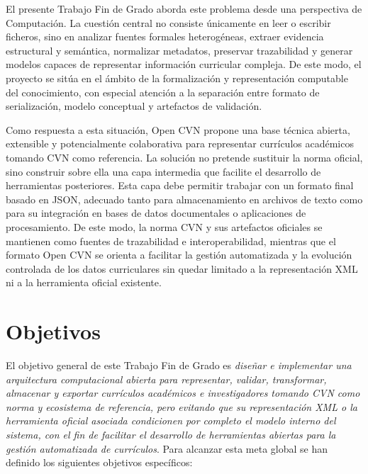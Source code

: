 El presente Trabajo Fin de Grado aborda este problema desde una perspectiva de
Computación. La cuestión central no consiste únicamente en leer o escribir
ficheros, sino en analizar fuentes formales heterogéneas, extraer evidencia
estructural y semántica, normalizar metadatos, preservar trazabilidad y generar
modelos capaces de representar información curricular compleja. De este modo, el
proyecto se sitúa en el ámbito de la formalización y representación computable del
conocimiento, con especial atención a la separación entre formato de
serialización, modelo conceptual y artefactos de validación.

Como respuesta a esta situación, Open CVN propone una base técnica abierta,
extensible y potencialmente colaborativa para representar currículos académicos
tomando CVN como referencia. La solución no pretende sustituir la norma oficial,
sino construir sobre ella una capa intermedia que facilite el desarrollo de
herramientas posteriores. Esta capa debe permitir trabajar con un formato final
basado en JSON, adecuado tanto para almacenamiento en archivos de texto como para
su integración en bases de datos documentales o aplicaciones de procesamiento. De
este modo, la norma CVN y sus artefactos oficiales se mantienen como fuentes de
trazabilidad e interoperabilidad, mientras que el formato Open CVN se orienta a
facilitar la gestión automatizada y la evolución controlada de los datos
curriculares sin quedar limitado a la representación XML ni a la herramienta
oficial existente.

\section{Objetivos}
\label{sec:introduccion_objetivos}

El objetivo general de este Trabajo Fin de Grado es \textit{diseñar e implementar
una arquitectura computacional abierta para representar, validar, transformar,
almacenar y exportar currículos académicos e investigadores tomando CVN como norma
y ecosistema de referencia, pero evitando que su representación XML o la
herramienta oficial asociada condicionen por completo el modelo interno del
sistema, con el fin de facilitar el desarrollo de herramientas abiertas para la
gestión automatizada de currículos}. Para alcanzar esta meta global se han
definido los siguientes objetivos específicos:

